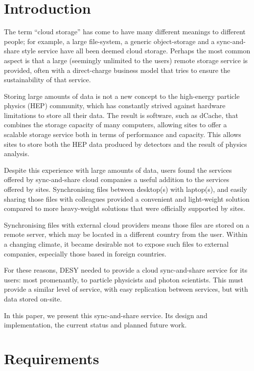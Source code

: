 \documentclass[a4paper]{jpconf}
\begin{document}
\section{Introduction}

The term ``cloud storage'' has come to have many different meanings to
different people; for example, a large file-system, a generic
object-storage and a sync-and-share style service have all been deemed
cloud storage.  Perhaps the most common aspect is that a large
(seemingly unlimited to the users) remote storage service is provided,
often with a direct-charge business model that tries to ensure the
sustainability of that service.

Storing large amounts of data is not a new concept to the high-energy
particle physics (HEP) community, which has constantly strived against
hardware limitations to store all their data.  The result is software,
such as dCache\cite{dcache}, that combines the storage capacity of
many computers, allowing sites to offer a scalable storage service
both in terms of performance and capacity.  This allows sites to store
both the HEP data produced by detectors and the result of physics
analysis.

Despite this experience with large amounts of data, users found the
services offered by sync-and-share cloud companies a useful addition
to the services offered by sites.  Synchronising files between
desktop(s) with laptop(s), and easily sharing those files with
colleagues provided a convenient and light-weight solution compared to
more heavy-weight solutions that were officially supported by sites.

Synchronising files with external cloud providers means those files
are stored on a remote server, which may be located in a different
country from the user.  Within a changing climate, it became desirable
not to expose such files to external companies, especially those based
in foreign countries.

For these reasons, DESY needed to provide a cloud sync-and-share
service for its users: most promenantly, to particle physicists and
photon scientists.  This must provide a similar level of service, with
easy replication between services, but with data stored on-site.

In this paper, we present this sync-and-share service.  Its design and
implementation, the current status and planned future work.

\section{Requirements}
\end{document}
